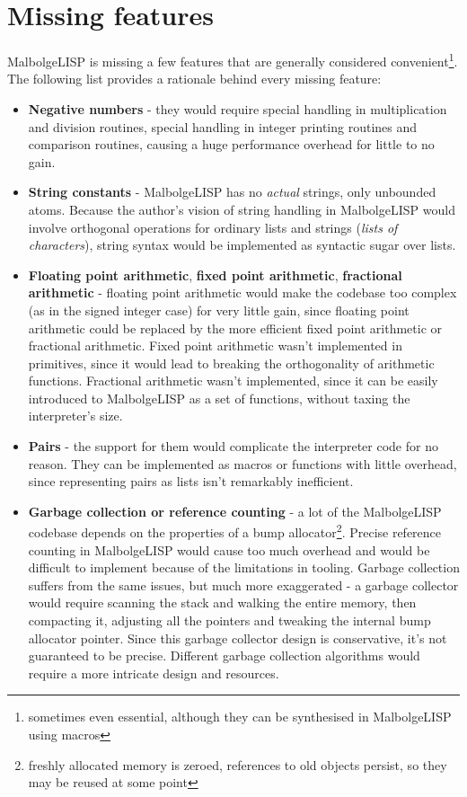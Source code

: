 \section{Missing features}

\par MalbolgeLISP is missing a few features that are generally considered convenient\footnote{sometimes even essential, although they can be synthesised in MalbolgeLISP using macros}. The following list provides a rationale behind every missing feature:

\begin{itemize}
    \item \textbf{Negative numbers} - they would require special handling in multiplication and division routines, special handling in integer printing routines and comparison routines, causing a huge performance overhead for little to no gain.
    \item \textbf{String constants} - MalbolgeLISP has no \textit{actual} strings, only unbounded atoms. Because the author's vision of string handling in MalbolgeLISP would involve orthogonal operations for ordinary lists and strings (\textit{lists of characters}), string syntax would be implemented as syntactic sugar over lists.
    \item \textbf{Floating point arithmetic}, \textbf{fixed point arithmetic}, \textbf{fractional arithmetic} - floating point arithmetic would make the codebase too complex (as in the signed integer case) for very little gain, since floating point arithmetic could be replaced by the more efficient fixed point arithmetic or fractional arithmetic. Fixed point arithmetic wasn't implemented in primitives, since it would lead to breaking the orthogonality of arithmetic functions. Fractional arithmetic wasn't implemented, since it can be easily introduced to MalbolgeLISP as a set of functions, without taxing the interpreter's size.
    \item \textbf{Pairs} - the support for them would complicate the interpreter code for no reason. They can be implemented as macros or functions with little overhead, since representing pairs as lists isn't remarkably inefficient.
    \item \textbf{Garbage collection or reference counting} - a lot of the MalbolgeLISP codebase depends on the properties of a bump allocator\footnote{freshly allocated memory is zeroed, references to old objects persist, so they may be reused at some point}. Precise reference counting in MalbolgeLISP would cause too much overhead and would be difficult to implement because of the limitations in tooling. Garbage collection suffers from the same issues, but much more exaggerated - a garbage collector would require scanning the stack and walking the entire memory, then compacting it, adjusting all the pointers and tweaking the internal bump allocator pointer. Since this garbage collector design is conservative, it's not guaranteed to be precise. Different garbage collection algorithms would require a more intricate design and resources.
\end{itemize}
